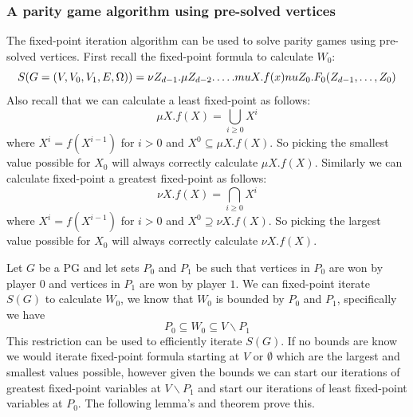 \subsubsection{A parity game algorithm using pre-solved vertices}
The fixed-point iteration algorithm can be used to solve parity games using pre-solved vertices. First recall the fixed-point formula to calculate $W_0$:
\[ S(G = (V,V_0,V_1,E,\Omega)) = \nu Z_{d-1}. \mu Z_{d-2}. \dots . \\mu X.f(x)nu Z_0. F_0(Z_{d-1},\dots,Z_0) \]
Also recall that we can calculate a least fixed-point as follows:
\[ \mu X.f(X) = \bigcup_{i \geq 0} X^i \]
where $X^i = f(X^{i-1})$ for $i > 0$ and $X^0 \subseteq \mu X.f(X)$. So picking the smallest value possible for $X_0$ will always correctly calculate $\mu X. f(X)$.
Similarly we can calculate fixed-point a greatest fixed-point as follows:
\[ \nu X.f(X) = \bigcap_{i \geq 0} X^i \]
where $X^i = f(X^{i-1})$ for $i > 0$ and $X^0 \supseteq \nu X.f(X)$. So picking the largest value possible for $X_0$ will always correctly calculate $\nu X. f(X)$.

Let $G$ be a PG and let sets $P_0$ and $P_1$ be such that vertices in $P_0$ are won by player $0$ and vertices in $P_1$ are won by player $1$. We can fixed-point iterate $S(G)$ to calculate $W_0$, we know that $W_0$ is bounded by $P_0$ and $P_1$, specifically we have
\[ P_0 \subseteq W_0 \subseteq V\backslash P_1\]
This restriction can be used to efficiently iterate $S(G)$. If no bounds are know we would iterate fixed-point formula starting at $V$ or $\emptyset$ which are the largest and smallest values possible, however given the bounds we can start our iterations of greatest fixed-point variables at $V\backslash P_1$ and start our iterations of least fixed-point variables at $P_0$. The following lemma's and theorem prove this.

